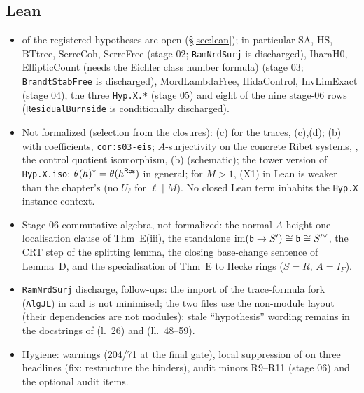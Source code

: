 \subsection{Lean}
\begin{itemize}
\item \NumHypOpen{} of the \NumHypRegistered{} registered hypotheses are open (\S\ref{sec:lean}); in particular SA, HS, BTtree, SerreCoh, SerreFree
  (stage 02; \texttt{RamNrdSurj} is discharged), IharaH0, EllipticCount (needs the Eichler class number formula) (stage 03; \texttt{BrandtStabFree} is discharged),
  MordLambdaFree, HidaControl, InvLimExact (stage 04), the three \texttt{Hyp.X.*} (stage 05) and eight of the nine stage-06 rows (\texttt{ResidualBurnside} is
  conditionally discharged).
\item Not formalized (selection from the closures): (c) for the traces, (c),(d);
  (b) with coefficients, \texttt{cor:s03-eis}; $A$-surjectivity on the concrete Ribet systems,
  , the control quotient isomorphism, (b) (schematic); the tower version of
  \texttt{Hyp.X.iso}; $\theta(h)^*=\theta(h^{\mathsf{Ros}})$ in general; for $M>1$, (X1) in Lean is weaker than the chapter's (no
  $U_\ell$ for $\ell\mid M$). No closed Lean term inhabits the \texttt{Hyp.X} instance context.
\item Stage-06 commutative algebra, not formalized: the normal-$A$ height-one localisation clause of Thm~E(iii), the
  standalone $\operatorname{im}(\mathfrak{b}\to S')\cong\mathfrak{b}\cong S'^\vee$, the CRT step of the splitting lemma, the closing base-change
  sentence of Lemma~D, and the specialisation of Thm~E to Hecke rings ($S=R$, $A=I_F$).
\item \texttt{RamNrdSurj} discharge, follow-ups: the import of the trace-formula fork (\texttt{AlgJL}) in
   and  is not minimised; the two files use the non-module layout
  (their dependencies are not modules); stale ``hypothesis'' wording remains in the docstrings of
   (l.~26) and  (ll.~48--59).
\item Hygiene: warnings (204/71 at the final gate), local suppression of  on three
  headlines (fix: restructure the  binders), audit minors R9--R11 (stage 06) and the optional audit items.
\end{itemize}

